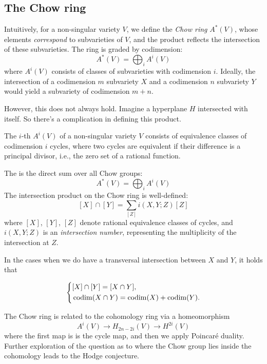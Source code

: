 \documentclass[12pt]{memoir}
\begin{document}
\subsection{The Chow ring}
Intuitively, for a non-singular variety $V$, we define the \emph{Chow ring} $A^\ast(V)$, whose elements \emph{correspond} to subvarieties of $V$, and the product reflects the intersection of these subvarieties. The ring is graded by codimension:
$$A^\ast(V) = \bigoplus_i A^i(V)$$
where $A^i(V)$ consists of classes of subvarieties with codimension $i$. Ideally, the intersection of a codimension $m$ subvariety $X$ and a codimension $n$ subvariety $Y$ would yield a subvariety of codimension $m+n$.\par
However, this does not always hold. Imagine a hyperplane $H$ intersected with itself. So there's a complication in defining this product.

\begin{Def}
    The $i$-th  $A^i(V)$ of a non-singular variety $V$ consists of equivalence classes of codimension $i$ cycles, where two cycles are equivalent if their difference is a principal divisor, i.e., the zero set of a rational function.
\end{Def}

The  is the direct sum over all Chow groups:
$$A^\ast(V) = \bigoplus_i A^i(V)$$
The intersection product on the Chow ring is well-defined:
$$[X] \cap [Y] = \sum_{[Z]} i(X, Y; Z) [Z]$$
where $[X]$, $[Y]$, $[Z]$ denote rational equivalence classes of cycles, and $i(X, Y; Z)$ is an \emph{intersection number}, representing the multiplicity of the intersection at $Z$.

\begin{Rmk}
In the cases when we do have a transversal intersection between $X$ and $Y$, it holds that 

$$
\left\lbrace
\begin{aligned}
&[X]\cap[Y]=[X\cap Y],\\
&\operatorname{codim}(X\cap Y)=\operatorname{codim}(X)+\operatorname{codim}(Y).
\end{aligned}
\right.
$$

\end{Rmk}

\begin{Rmk}
    The Chow ring is related to the cohomology ring via a homeomorphism 
    $$A^i(V)\to H_{2n-2i}(V)\to H^{2i}(V)$$
    where the first map is is the cycle map, and then we apply Poincaré duality. Further exploration of the question as to where the Chow group lies inside the cohomology leads to the Hodge conjecture.
\end{Rmk}
\end{document}
